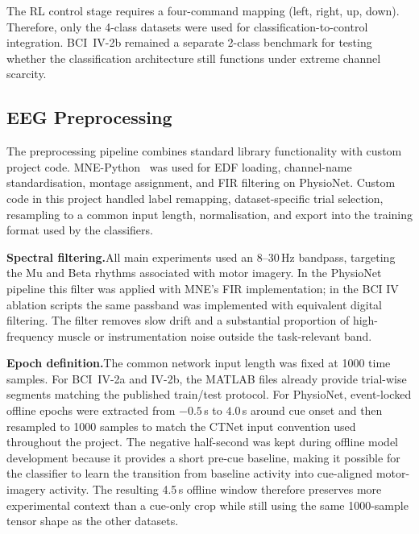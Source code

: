 \documentclass[12pt, a4paper]{article}
\begin{document}
The RL control stage requires a four-command mapping (left, right, up, down). Therefore, only the 4-class datasets were used for classification-to-control integration. BCI~IV-2b remained a separate 2-class benchmark for testing whether the classification architecture still functions under extreme channel scarcity.

\subsection{EEG Preprocessing}

The preprocessing pipeline combines standard library functionality with custom project code. MNE-Python~\cite{gramfort2013mne} was used for EDF loading, channel-name standardisation, montage assignment, and FIR filtering on PhysioNet. Custom code in this project handled label remapping, dataset-specific trial selection, resampling to a common input length, normalisation, and export into the training format used by the classifiers.

\textbf{Spectral filtering.}\quad All main experiments used an 8--30\,Hz bandpass, targeting the Mu and Beta rhythms associated with motor imagery. In the PhysioNet pipeline this filter was applied with MNE's FIR implementation; in the BCI IV ablation scripts the same passband was implemented with equivalent digital filtering. The filter removes slow drift and a substantial proportion of high-frequency muscle or instrumentation noise outside the task-relevant band.

\textbf{Epoch definition.}\quad The common network input length was fixed at 1000 time samples. For BCI~IV-2a and IV-2b, the MATLAB files already provide trial-wise segments matching the published train/test protocol. For PhysioNet, event-locked offline epochs were extracted from $-0.5$\,s to $4.0$\,s around cue onset and then resampled to 1000 samples to match the CTNet input convention used throughout the project. The negative half-second was kept during offline model development because it provides a short pre-cue baseline, making it possible for the classifier to learn the transition from baseline activity into cue-aligned motor-imagery activity. The resulting 4.5\,s offline window therefore preserves more experimental context than a cue-only crop while still using the same 1000-sample tensor shape as the other datasets.
\end{document}
